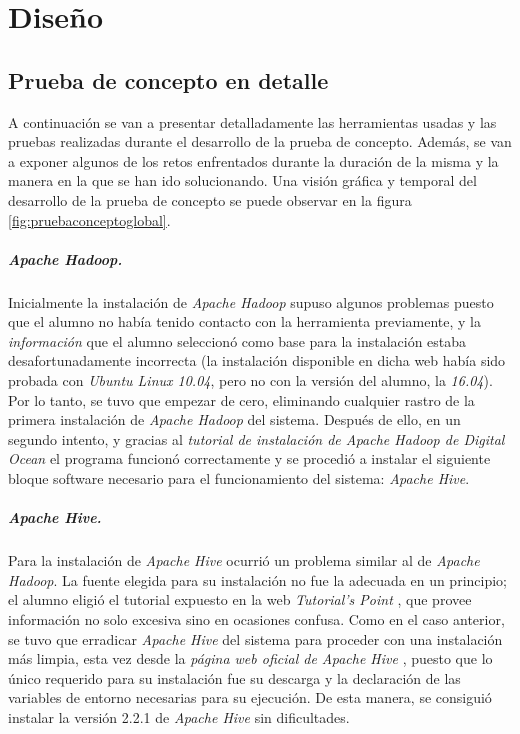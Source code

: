 \chapter{Diseño} 
\label{e.disenyo}
\section{Prueba de concepto en detalle} 
\label{e.disenyo.pruebaconcepto}
A continuación se van a presentar detalladamente las herramientas usadas y las pruebas realizadas durante el desarrollo de la prueba de concepto. Además, se van a exponer algunos de los retos enfrentados durante la duración de la misma y la manera en la que se han ido solucionando. Una visión gráfica y temporal del desarrollo de la prueba de concepto se puede observar en la figura \ref{fig:pruebaconceptoglobal}. 

\par
\paragraph*{Apache Hadoop.}

\par
Inicialmente la instalación de \textit{Apache Hadoop} supuso algunos problemas puesto que el alumno no había tenido contacto con la herramienta previamente, y la \textit{información} \cite{hadoop_installation_bad} que el alumno seleccionó como base para la instalación estaba desafortunadamente incorrecta (la instalación disponible en dicha web había sido probada con \textit{Ubuntu Linux 10.04}, pero no con la versión del alumno, la \textit{16.04}). Por lo tanto, se tuvo que empezar de cero, eliminando cualquier rastro de la primera instalación de \textit{Apache Hadoop} del sistema. Después de ello, en un segundo intento, y gracias al \textit{tutorial de instalación de Apache Hadoop de Digital Ocean} \cite{hadoop_installation} el programa funcionó correctamente y se procedió a instalar el siguiente bloque software necesario para el funcionamiento del sistema: \textit{Apache Hive}.


\par
\paragraph*{Apache Hive.}

\par
Para la instalación de \textit{Apache Hive} ocurrió un problema similar al de \textit{Apache Hadoop}. La fuente elegida para su instalación no fue la adecuada en un principio; el alumno eligió el tutorial expuesto en la web \textit{Tutorial's Point} \cite{hivetutorialspoint}, que provee información no solo excesiva sino en ocasiones confusa. Como en el caso anterior, se tuvo que erradicar \textit{Apache Hive} del sistema para proceder con una instalación más limpia, esta vez desde la \textit{página web oficial de Apache Hive} \cite{hive_installation}, puesto que lo único requerido para su instalación fue su descarga y la declaración de las variables de entorno necesarias para su ejecución. De esta manera, se consiguió instalar la versión 2.2.1 de \textit{Apache Hive} sin dificultades. 


